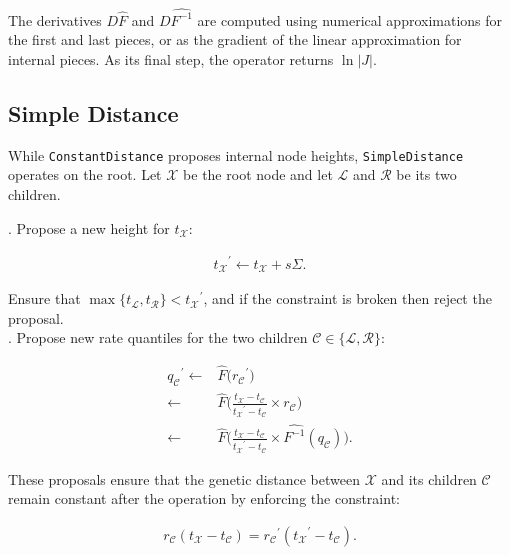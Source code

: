 \documentclass[12pt]{article}
\begin{document}
The derivatives $D\hat{F}$ and $D\hat{F^{-1}}$ are computed using numerical approximations for the first and last pieces, or as the gradient of the linear approximation for internal pieces.
As its final step, the operator returns $\ln |J|$. 




\subsection*{Simple Distance}

While \texttt{ConstantDistance} proposes internal node heights, \texttt{SimpleDistance} operates on the root. Let $\mathcal{X}$ be the root node and let $\mathcal{L}$ and $\mathcal{R}$ be its two children.

. Propose a new height for $t_\mathcal{X}$:

\begin{align}
	{t_\mathcal{X}}^\prime \leftarrow t_\mathcal{X} + s\Sigma.
\end{align}

Ensure that $\max\{t_\mathcal{L}, t_\mathcal{R} \} < {t_\mathcal{X}}^\prime$, and if the constraint is broken then reject the proposal.  \\


. Propose new rate quantiles for the two children $\mathcal{C} \in \{\mathcal{L}, \mathcal{R}\}$:



\begin{align}
	{q_\mathcal{C}}^\prime  \leftarrow & \hat{F}\Big({r_\mathcal{C}}^\prime \Big)  \nonumber \\
				\leftarrow & \hat{F}\Big( \frac{t_\mathcal{X} - t_\mathcal{C}}{{t_\mathcal{X}}^\prime - t_\mathcal{C}} \times r_\mathcal{C} \Big) \nonumber \\
				\leftarrow & \hat{F}\Big( \frac{t_\mathcal{X} - t_\mathcal{C}}{{t_\mathcal{X}}^\prime - t_\mathcal{C}} \times \hat{F^{-1}}(q_\mathcal{C}) \Big).
\end{align}




These proposals ensure that the genetic distance between $\mathcal{X}$ and its children $\mathcal{C}$ remain constant after the operation by enforcing the constraint:


\begin{align}
	r_\mathcal{C} (t_\mathcal{X} - t_\mathcal{C}) = {r_\mathcal{C}}^\prime ({t_\mathcal{X}}^\prime - t_\mathcal{C}).
\end{align}
\end{document}
